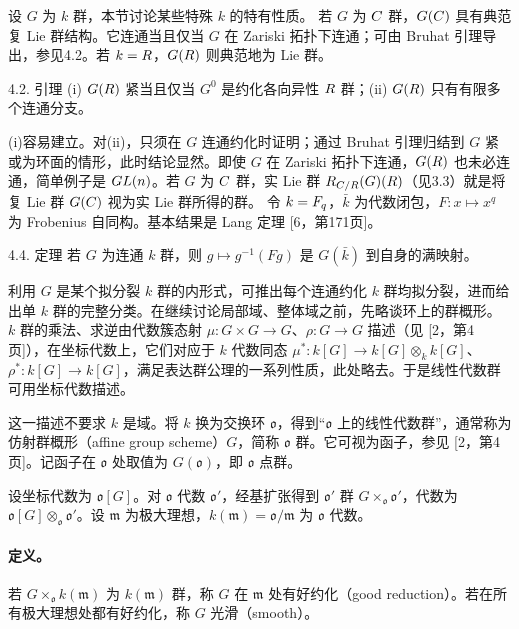 设 $G$ 为 $k$ 群，本节讨论某些特殊 $k$ 的特有性质。
若 $G$ 为 $C$ 群，$G(C)$ 具有典范复 Lie 群结构。它连通当且仅当 $G$ 在 Zariski 拓扑下连通；可由 Bruhat 引理导出，参见4.2。若 $k=R$，$G(R)$ 则典范地为 Lie 群。
\begin{originaltheorem}{4.2. 引理}
(i) $G(R)$ 紧当且仅当 $G^0$ 是约化各向异性 $R$ 群；(ii) $G(R)$ 只有有限多个连通分支。
\end{originaltheorem}
(i)容易建立。对(ii)，只须在 $G$ 连通约化时证明；通过 Bruhat 引理归结到 $G$ 紧或为环面的情形，此时结论显然。即使 $G$ 在 Zariski 拓扑下连通，$G(R)$ 也未必连通，简单例子是 $GL(n)$。若 $G$ 为 $C$ 群，实 Lie 群 $R_{C/R}(G)(R)$（见3.3）就是将复 Lie 群 $G(C)$ 视为实 Lie 群所得的群。
令 $k=F_q$，$\bar k$ 为代数闭包，$F:x\mapsto x^q$ 为 Frobenius 自同构。基本结果是 Lang 定理 [6，第171页]。
\begin{originaltheorem}{4.4. 定理}
若 $G$ 为连通 $k$ 群，则 $g\mapsto g^{-1}(Fg)$ 是 $G(\bar k)$ 到自身的满映射。
\end{originaltheorem}
利用 $G$ 是某个拟分裂 $k$ 群的内形式，可推出每个连通约化 $k$ 群均拟分裂，进而给出单 $k$ 群的完整分类。在继续讨论局部域、整体域之前，先略谈环上的群概形。
$k$ 群的乘法、求逆由代数簇态射 $\mu:G\times G\to G$、$\rho:G\to G$ 描述（见 [2，第4页]），在坐标代数上，它们对应于 $k$ 代数同态 $\mu^*:k[G]\to k[G]\otimes_kk[G]$、$\rho^*:k[G]\to k[G]$，满足表达群公理的一系列性质，此处略去。于是线性代数群可用坐标代数描述。

这一描述不要求 $k$ 是域。将 $k$ 换为交换环 $\mathfrak o$，得到“$\mathfrak o$ 上的线性代数群”，通常称为仿射群概形（affine group scheme）$G$，简称 $\mathfrak o$ 群。它可视为函子，参见 [2，第4页]。记函子在 $\mathfrak o$ 处取值为 $G(\mathfrak o)$，即 $\mathfrak o$ 点群。

设坐标代数为 $\mathfrak o[G]$。对 $\mathfrak o$ 代数 $\mathfrak o'$，经基扩张得到 $\mathfrak o'$ 群 $G\times_{\mathfrak o}\mathfrak o'$，代数为 $\mathfrak o[G]\otimes_{\mathfrak o}\mathfrak o'$。设 $\mathfrak m$ 为极大理想，$k(\mathfrak m)=\mathfrak o/\mathfrak m$ 为 $\mathfrak o$ 代数。

\paragraph*{定义。} 若 $G\times_{\mathfrak o}k(\mathfrak m)$ 为 $k(\mathfrak m)$ 群，称 $G$ 在 $\mathfrak m$ 处有好约化（good reduction）。若在所有极大理想处都有好约化，称 $G$ 光滑（smooth）。

